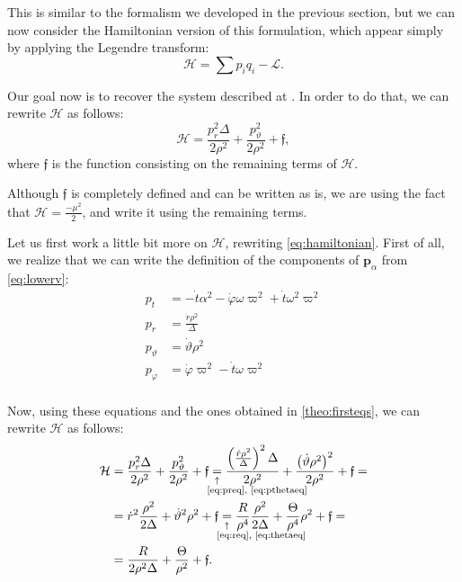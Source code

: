 This is similar to the formalism we developed in the previous section, but we can now consider the Hamiltonian version of this formulation, which appear simply by applying the Legendre transform:
\begin{equation*}
	\mathcal{H} = \sum p_i q_i - \mathcal{L}.
\end{equation*}

Our goal now is to recover the system described at \cite[Eq. (A.15)]{thorne15}. In order to do that, we can rewrite $\mathcal{H}$ as follows:
\begin{equation}
	\label{eq:hamiltonian}
	\mathcal{H} = \frac{p_r^2 \Delta}{2\rho^2} + \frac{p_\vartheta^2}{2\rho^2} + \mathfrak{f},
\end{equation}
where $\mathfrak{f}$ is the function consisting on the remaining terms of $\mathcal{H}$.

Although $\mathfrak{f}$ is completely defined and can be written as is, we are using the fact that $\mathcal{H} = \frac{-\mu^2}{2}$, and write it using the remaining terms.

Let us first work a little bit more on $\mathcal{H}$, rewriting \autoref{eq:hamiltonian}. First of all, we realize that we can write the definition of the components of $\mathbf{p}_\alpha$ from \autoref{eq:lowerv}:
\begin{align}
	\label{eq:pteq}
	p_t &= -\dot{t}\alpha^2 - \dot{\varphi}\omega\varpi^2 + \dot{t}\omega^2\varpi^2 \\
	\label{eq:preq}
	p_r &= \frac{\dot{r}\rho^2}{\Delta}\\
	\label{eq:pthetaeq}
	p_\vartheta &= \dot{\vartheta}\rho^2\\
	\label{eq:pphieq}
	p_\varphi &= \dot{\varphi}\varpi^2 - \dot{t}\omega\varpi^2\\
\end{align}

Now, using these equations and the ones obtained in \autoref{theo:firsteqs}, we can rewrite $\mathcal{H}$ as follows:
\begin{align*}
	\mathcal{H} &= \frac{p_r^2 \Delta}{2\rho^2} + \frac{p_\vartheta^2}{2\rho^2} + \mathfrak{f} \eqnote{=}{\ref{eq:preq}, \ref{eq:pthetaeq}} \frac{\left( \frac{\dot{r}\rho^2}{\Delta} \right)^2 \Delta}{2\rho^2} + \frac{\left(\dot{\vartheta}\rho^2\right)^2}{2\rho^2} + \mathfrak{f} = \\
	&= \dot{r}^2\frac{\rho^2}{2\Delta} + \dot{\vartheta}^2\rho^2 + \mathfrak{f} \eqnote{=}{\ref{eq:req}, \ref{eq:thetaeq}} \frac{R}{\rho^4 }\frac{\rho^2}{2\Delta} + \frac{\Theta}{\rho^4}\rho^2 + \mathfrak{f} =\\
	&= \frac{R}{2\rho^2\Delta} + \frac{\Theta}{\rho^2} + \mathfrak{f}.
\end{align*}

